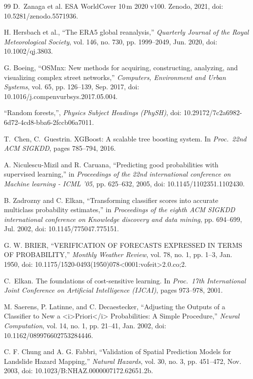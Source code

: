 \begin{thebibliography}{99}
D.~Zanaga et al. ESA WorldCover 10\,m 2020 v100. Zenodo, 2021, doi: 10.5281/zenodo.5571936.

H. Hersbach et al., ``The ERA5 global reanalysis,'' \emph{Quarterly Journal of the Royal Meteorological Society}, vol. 146, no. 730, pp. 1999--2049, Jun. 2020, doi: 10.1002/qj.3803.

G. Boeing, ``OSMnx: New methods for acquiring, constructing, analyzing, and visualizing complex street networks,'' \emph{Computers, Environment and Urban Systems}, vol. 65, pp. 126--139, Sep. 2017, doi: 10.1016/j.compenvurbsys.2017.05.004.

``Random forests,'', \emph{Physics Subject Headings (PhySH)}, doi: 10.29172/7c2a6982-6d72-4cd8-bba6-2fccb06a7011.

T.~Chen, C.~Guestrin. XGBoost: A scalable tree boosting system. In \emph{Proc.\ 22nd ACM SIGKDD}, pages 785--794, 2016.

A. Niculescu-Mizil and R. Caruana, ``Predicting good probabilities with supervised learning,'' in \emph{Proceedings of the 22nd international conference on Machine learning - ICML '05}, pp. 625--632, 2005, doi: 10.1145/1102351.1102430.

B. Zadrozny and C. Elkan, ``Transforming classifier scores into accurate multiclass probability estimates,'' in \emph{Proceedings of the eighth ACM SIGKDD international conference on Knowledge discovery and data mining}, pp. 694--699, Jul. 2002, doi: 10.1145/775047.775151.

G. W. BRIER, ``VERIFICATION OF FORECASTS EXPRESSED IN TERMS OF PROBABILITY,'' \emph{Monthly Weather Review}, vol. 78, no. 1, pp. 1--3, Jan. 1950, doi: 10.1175/1520-0493(1950)078<0001:vofeit>2.0.co;2.

C.~Elkan. The foundations of cost-sensitive learning. In \emph{Proc.\ 17th International Joint Conference on Artificial Intelligence (IJCAI)}, pages 973--978, 2001.

M. Saerens, P. Latinne, and C. Decaestecker, ``Adjusting the Outputs of a Classifier to New a <i>Priori</i> Probabilities: A Simple Procedure,'' \emph{Neural Computation}, vol. 14, no. 1, pp. 21--41, Jan. 2002, doi: 10.1162/089976602753284446.

C. F. Chung and A. G. Fabbri, ``Validation of Spatial Prediction Models for Landslide Hazard Mapping,'' \emph{Natural Hazards}, vol. 30, no. 3, pp. 451--472, Nov. 2003, doi: 10.1023/B:NHAZ.0000007172.62651.2b.


\end{thebibliography}
